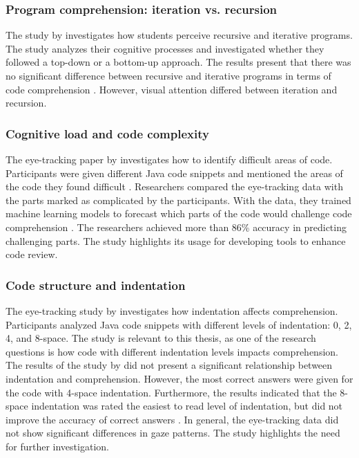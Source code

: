 \subsubsection{Program comprehension: iteration vs. recursion} 
The study by \citet{aroobaunderstanding} investigates how students perceive recursive and iterative programs. The study analyzes their cognitive processes and investigated whether they followed a top-down or a bottom-up approach.
The results present that there was no significant difference between recursive and iterative programs in terms of code comprehension \cite{aroobaunderstanding}. However, visual attention differed between iteration and recursion.

\subsubsection{Cognitive load and code complexity} 

The eye-tracking paper by \citet{abbad2022estimating} investigates how to identify difficult areas of code.  Participants were given different Java code snippets and mentioned the areas of the code they found difficult \cite{abbad2022estimating}. Researchers compared the eye-tracking data with the parts marked as complicated by the participants. With the data, they trained machine learning models to forecast which parts of the code would challenge code comprehension \cite{abbad2022estimating}. The researchers achieved more than 86\% accuracy in predicting challenging  parts. The study highlights its usage for developing tools to enhance code review.  



\subsubsection{Code structure and indentation} 


The eye-tracking study by \citet{bauer2017indentations} investigates how indentation affects comprehension. Participants analyzed Java code snippets with different levels of indentation: 0, 2, 4, and 8-space. The study is relevant to this thesis, as one of the research questions is how code with different indentation levels impacts comprehension. The results of the study by \citet{bauer2017indentations} did not present a significant relationship between indentation and comprehension. However, the most correct answers were given for the code with 4-space indentation. Furthermore, the results indicated that the 8-space indentation was rated the easiest to read level of indentation, but did not improve the accuracy of correct answers \cite{bauer2017indentations}. In general, the eye-tracking data did not show significant differences in gaze patterns. The study highlights the need for further investigation. 


